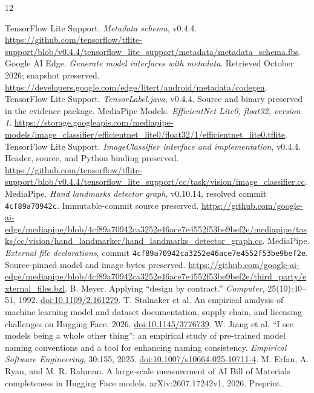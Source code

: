 \documentclass[10pt,twocolumn,letterpaper]{article}
\newcommand{\code}[1]{\texttt{#1}}
\begin{document}
\begin{thebibliography}{12}\small\raggedright
{} TensorFlow Lite Support. \emph{Metadata schema}, v0.4.4. \url{https://github.com/tensorflow/tflite-support/blob/v0.4.4/tensorflow_lite_support/metadata/metadata_schema.fbs}.
 Google AI Edge. \emph{Generate model interfaces with metadata}. Retrieved October 2026; snapshot preserved. \url{https://developers.google.com/edge/litert/android/metadata/codegen}.
 TensorFlow Lite Support. \emph{TensorLabel.java}, v0.4.4. Source and binary preserved in the evidence package.
 MediaPipe Models. \emph{EfficientNet Lite0, float32, version 1}. \url{https://storage.googleapis.com/mediapipe-models/image_classifier/efficientnet_lite0/float32/1/efficientnet_lite0.tflite}.
 TensorFlow Lite Support. \emph{ImageClassifier interface and implementation}, v0.4.4. Header, source, and Python binding preserved. \url{https://github.com/tensorflow/tflite-support/blob/v0.4.4/tensorflow_lite_support/cc/task/vision/image_classifier.cc}.
 MediaPipe. \emph{Hand landmarks detector graph}, v0.10.14, resolved commit \code{4cf89a70942c}. Immutable-commit source preserved. \url{https://github.com/google-ai-edge/mediapipe/blob/4cf89a70942ca3252e46ace7e4552f53be9bef2e/mediapipe/tasks/cc/vision/hand_landmarker/hand_landmarks_detector_graph.cc}.
 MediaPipe. \emph{External file declarations}, commit \code{4cf89a70942ca3252e46ace7e4552f53be9bef2e}. Source-pinned model and image bytes preserved. \url{https://github.com/google-ai-edge/mediapipe/blob/4cf89a70942ca3252e46ace7e4552f53be9bef2e/third_party/external_files.bzl}.
 B. Meyer. Applying ``design by contract.'' \emph{Computer}, 25(10):40--51, 1992. \href{https://doi.org/10.1109/2.161279}{doi:10.1109/2.161279}.
 T. Stalnaker et al. An empirical analysis of machine learning model and dataset documentation, supply chain, and licensing challenges on Hugging Face. 2026. \href{https://doi.org/10.1145/3776739}{doi:10.1145/3776739}.
 W. Jiang et al. ``I see models being a whole other thing'': an empirical study of pre-trained model naming conventions and a tool for enhancing naming consistency. \emph{Empirical Software Engineering}, 30:155, 2025. \href{https://doi.org/10.1007/s10664-025-10711-4}{doi:10.1007/s10664-025-10711-4}.
 M. Erfan, A. Ryan, and M. R. Rahman. A large-scale measurement of AI Bill of Materials completeness in Hugging Face models. arXiv:2607.17242v1, 2026. Preprint.
\end{thebibliography}
\end{document}
